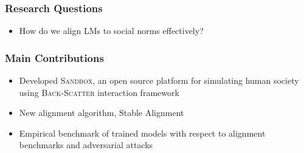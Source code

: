 \documentclass[xcolor=dvipsnames]{beamer}
\newcommand{\0}{\vec{0}}
\begin{document}
		\begin{frame}
			\frametitle{Research Questions
			}
			\begin{itemize}
				\item How do we align LMs to social norms effectively?
			\end{itemize}
		\end{frame}
		
		\begin{frame}
			\frametitle{Main Contributions
			}
			\begin{itemize}
				\item Developed \textsc{Sandbox}, an open source platform for simulating human society using \textsc{Back-Scatter} interaction framework
				\item New alignment algorithm, Stable Alignment
				\item Empirical benchmark of trained models with respect to alignment benchmarks and adversarial attacks
			\end{itemize}
		\end{frame}
	
\end{document}
